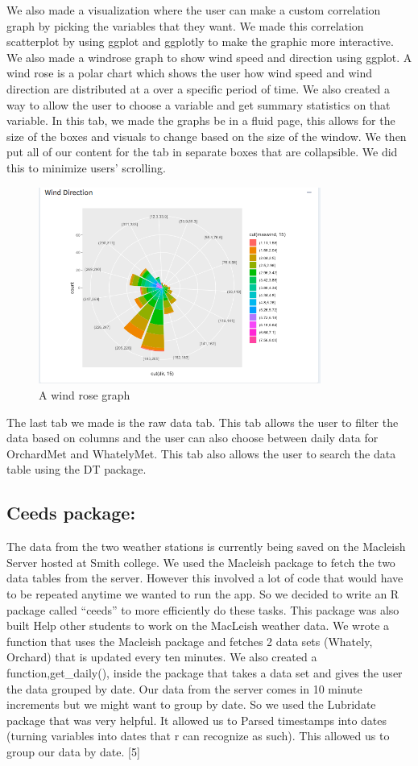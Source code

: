 \documentclass[10pt,letterpaper]{article}
\begin{document}
We also made a visualization where the user can make a custom
correlation graph by picking the variables that they want. We made this
correlation scatterplot by using ggplot and ggplotly to make the graphic
more interactive. We also made a windrose graph to show wind speed and
direction using ggplot. A wind rose is a polar chart which shows the
user how wind speed and wind direction are distributed at a over a
specific period of time. We also created a way to allow the user to
choose a variable and get summary statistics on that variable. In this
tab, we made the graphs be in a fluid page, this allows for the size of
the boxes and visuals to change based on the size of the window. We then
put all of our content for the tab in separate boxes that are
collapsible. We did this to minimize users' scrolling.

\begin{figure}
\includegraphics[width=350px]{windrose} \caption{A wind rose graph}\label{fig:unnamed-chunk-4}
\end{figure}

The last tab we made is the raw data tab. This tab allows the user to
filter the data based on columns and the user can also choose between
daily data for OrchardMet and WhatelyMet. This tab also allows the user
to search the data table using the DT package.

\subsection{Ceeds package:}\label{ceeds-package}

The data from the two weather stations is currently being saved on the
Macleish Server hosted at Smith college. We used the Macleish package to
fetch the two data tables from the server. However this involved a lot
of code that would have to be repeated anytime we wanted to run the app.
So we decided to write an R package called ``ceeds'' to more efficiently
do these tasks. This package was also built Help other students to work
on the MacLeish weather data. We wrote a function that uses the Macleish
package and fetches 2 data sets (Whately, Orchard) that is updated every
ten minutes. We also created a function,get\_daily(), inside the package
that takes a data set and gives the user the data grouped by date. Our
data from the server comes in 10 minute increments but we might want to
group by date. So we used the Lubridate package that was very helpful.
It allowed us to Parsed timestamps into dates (turning variables into
dates that r can recognize as such). This allowed us to group our data
by date. {[}5{]}
\end{document}

